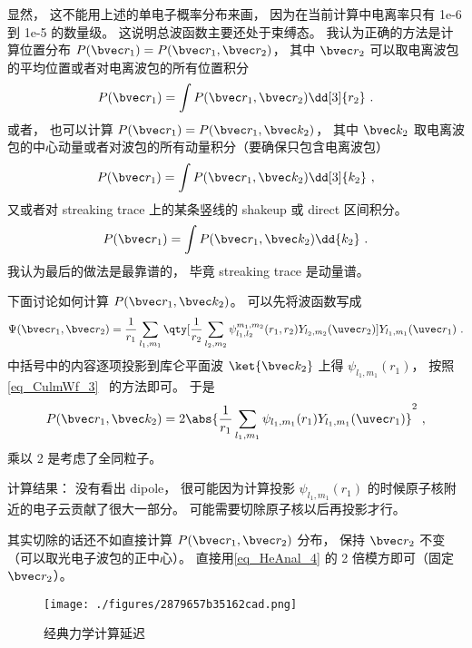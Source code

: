 显然， 这不能用上述的单电子概率分布来画， 因为在当前计算中电离率只有 1e-6 到 1e-5 的数量级。 这说明总波函数主要还处于束缚态。 我认为正确的方法是计算位置分布 $P(\bvec r_1) = P(\bvec r_1, \bvec r_2)$， 其中 $\bvec r_2$ 可以取电离波包的平均位置或者对电离波包的所有位置积分
\begin{equation}
P(\bvec r_1) = \int P(\bvec r_1, \bvec r_2) \dd[3]{r_2}~.
\end{equation}
或者， 也可以计算 $P(\bvec r_1) = P(\bvec r_1, \bvec k_2)$， 其中 $\bvec k_2$ 取电离波包的中心动量或者对波包的所有动量积分（要确保只包含电离波包）
\begin{equation}
P(\bvec r_1) = \int P(\bvec r_1, \bvec k_2) \dd[3]{k_2}~,
\end{equation}
又或者对 streaking trace 上的某条竖线的 shakeup 或 direct 区间积分。
\begin{equation}
P(\bvec r_1) = \int P(\bvec r_1, \bvec k_2) \dd{k_2}~.
\end{equation}
我认为最后的做法是最靠谱的， 毕竟 streaking trace 是动量谱。

下面讨论如何计算 $P(\bvec r_1, \bvec k_2)$。 可以先将波函数写成
\begin{equation}\label{eq_HeAnal_4}
\Psi(\bvec r_1, \bvec r_2) = \frac{1}{r_1}\sum_{l_1,m_1} \qty[\frac{1}{r_2}\sum_{l_2,m_2} \psi_{l_1,l_2}^{m_1,m_2}(r_1, r_2) Y_{l_2,m_2}(\uvec r_2)] Y_{l_1,m_1}(\uvec r_1)~.
\end{equation}
中括号中的内容逐项投影到库仑平面波 $\ket{\bvec k_2}$ 上得 $\psi_{l_1,m_1}(r_1)$， 按照\autoref{eq_CulmWf_3}~ 的方法即可。 于是
\begin{equation}\label{eq_HeAnal_1}
P(\bvec r_1, \bvec k_2) = 2\abs{\frac{1}{r_1}\sum_{l_1,m_1} \psi_{l_1,m_1}(r_1) Y_{l_1,m_1}(\uvec r_1)}^2~,
\end{equation}
乘以 2 是考虑了全同粒子。

计算结果： 没有看出 dipole， 很可能因为计算投影 $\psi_{l_1,m_1}(r_1)$ 的时候原子核附近的电子云贡献了很大一部分。 可能需要切除原子核以后再投影才行。

其实切除的话还不如直接计算 $P(\bvec r_1, \bvec r_2)$ 分布， 保持 $\bvec r_2$ 不变（可以取光电子波包的正中心）。 直接用\autoref{eq_HeAnal_4} 的 2 倍模方即可（固定 $\bvec r_2$）。

\begin{figure}[ht]
\centering
\texttt{[image: ./figures/2879657b35162cad.png]}
\caption{经典力学计算延迟} \label{fig_HeAnal_1}
\end{figure}

